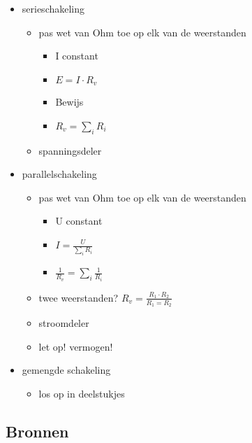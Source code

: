 \documentclass[11pt]{article}
\let\originalitem\item
\renewcommand{\item}{\originalitem[]}
\newcommand{\Newpage}{\end{preview}\begin{preview}}
\begin{document}
\begin{preview}
\begin{itemize}
\item serieschakeling
	\begin{itemize}
		\item pas wet van Ohm toe op elk van de weerstanden
		\begin{itemize}
			\item I constant
			\item $E=I \cdot R_v$
			\item Bewijs  %
			\item $R_v = \sum_i R_i$
		\end{itemize}
		\item spanningsdeler
	\end{itemize}
\item parallelschakeling
	\begin{itemize}
		\item pas wet van Ohm toe op elk van de weerstanden
		\begin{itemize}
			\item U constant
			\item $I = \frac{U}{\sum_i R_i}$
			\item $\frac{1}{R_v} = \sum_i \frac{1}{R_i}$
		\end{itemize}
		\item twee weerstanden? $R_v = \frac{R_1 \cdot R_2}{R_1 = R_2}$
		\item stroomdeler
		\item let op! vermogen! %
	\end{itemize}
\item gemengde schakeling
	\begin{itemize}
		\item los op in deelstukjes
	\end{itemize}
\end{itemize}

\Newpage
\section{Bronnen}


\end{preview}
\end{document}

